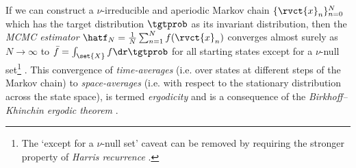 If we can construct a $\nu$-irreducible and aperiodic Markov chain $\lbrace \rvct{x}_n \rbrace_{n=0}^N$ which has the target distribution $\tgtprob$ as its invariant distribution, then the \emph{\ac{MCMC} estimator} $\hatf_N = \frac{1}{N}\sum_{n=1}^N f(\rvct{x}_n)$ converges almost surely as $N \to \infty$ to $\bar{f} = \int_{\set{X}} f \dr\tgtprob$ for all starting states except for a $\nu$-null set\footnote{The `except for a $\nu$-null set' caveat can be removed by requiring the stronger property of \emph{Harris recurrence} \citep{harris1956existence}.}%
 \citep{meyn1993markov}. This convergence of \emph{time-averages} (i.e. over states at different steps of the Markov chain) to \emph{space-averages} (i.e. with respect to the stationary distribution across the state space), is termed \emph{ergodicity} and is a consequence of the \emph{Birkhoff--Khinchin ergodic theorem} \citep{birkhoff1931proof}.

